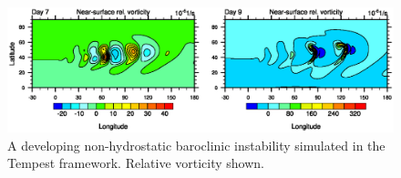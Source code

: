 \documentclass[11pt]{article}
\begin{document}

\begin{figure}
\begin{center}
\includegraphics[width=6in]{UMJSTest-Results}
\end{center}
\caption{A developing non-hydrostatic baroclinic instability simulated in the Tempest framework.  Relative vorticity shown.} \label{fig:TempestBaroclinicInstability}
\end{figure}
\end{document}
